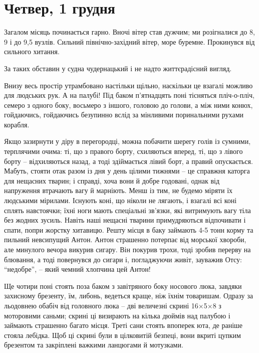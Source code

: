 
 
 
 
 
\section{Четвер, 1 грудня}

Загалом місяць починається гарно. Вночі вітер став дужчим; ми розігналися до 8,
9 і до 9,5 вузлів. Сильний північно-західний вітер, море буремне. Прокинувся
від сильного хитання.

За таких обставин у судна чудернацький і не надто життєрадісний вигляд.

Внизу весь простір утрамбовано настільки щільно, наскільки це взагалі можливо
для людських рук. А на палубі! Під баком п’ятнадцять поні тісняться
пліч-о-пліч, семеро з одного боку, восьмеро з іншого, головою до голови, а між
ними конюх, гойдаючись, гойдаючись безупинно вслід за мінливими поринальними
рухами корабля.

Якщо зазирнути у діру в перегородці, можна побачити шерегу голів із сумними,
терплячими очима: ті, що з правого борту, схиляються вперед, ті, що з лівого
борту – відхиляються назад, а тоді здіймається лівий борт, а правий
опускається. Мабуть, стояти отак разом із дня у день цілими тижнями – це
справжня каторга для нещасних тварин; і справді, хоча вони й добре годовані,
однак від напруження втрачають вагу й марніють. Менш із тим, не будемо міряти
їх людськими мірилами. Існують коні, що ніколи не лягають, і взагалі всі коні
сплять навстоячки; їхні ноги мають спеціальні зв’язки, які витримують вагу тіла
без жодних зусиль. Навіть наші нещасні тварини примудряються відпочивати і
спати, попри жорстку хитавицю. Решту місця в баку займають 4-5 тонн корму та
пильний невсипущий Антон. Антон страшенно потерпає від морської хвороби, але
минулого вечора викурив сигару. Він покурив трохи, тоді зробив перерву на
блювання, а тоді повернувся до сигари і, погладжуючи живіт, зауважив Отсу:
\enquote{недобре}, – який чемний хлопчина цей Антон! 

Ще чотири поні стоять поза баком з завітряного боку носового люка, завдяки
захисному брезенту, їм, либонь, ведеться краще, ніж їхнім товаришам. Одразу за
льодовнею обабіч від головного люка – дві величезні скрині 16×5×8 з моторовими
саньми; скрині ці визирають на кілька дюймів над палубою і займають страшенно
багато місця. Треті сани стоять впоперек юта, де раніше стояла лебідка. Щоб ці
скрині були в цілковитій безпеці, вони вкриті цупким брезентом та закріплені
важкими ланцюгами й мотузками.

